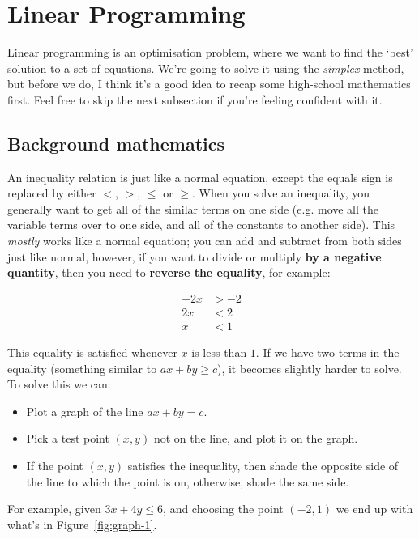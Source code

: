 
\section{Linear Programming}

Linear programming is an optimisation problem, where we want to find the `best'
solution to a set of equations. We're going to solve it using the
\textit{simplex} method, but before we do, I think it's a good idea to recap
some high-school mathematics first. Feel free to skip the next subsection if
you're feeling confident with it.

\subsection{Background mathematics}

An inequality relation is just like a normal equation, except the equals sign is
replaced by either $<$, $>$, $\leq$ or $\geq$. When you solve an inequality, you
generally want to get all of the similar terms on one side (e.g. move all the
variable terms over to one side, and all of the constants to another side). This
\textit{mostly} works like a normal equation; you can add and subtract from both
sides just like normal, however, if you want to divide or multiply \textbf{by a
negative quantity}, then you need to \textbf{reverse the equality}, for example:

\[
  \begin{split}
    -2x &> -2\\
    2x &< 2\\
    x &< 1
  \end{split}
\]

This equality is satisfied whenever $x$ is less than $1$. If we have two terms
in the equality (something similar to $ax + by \geq c$), it becomes slightly
harder to solve. To solve this we can:

\begin{itemize}
  \item Plot a graph of the line $ax + by = c$.
  \item Pick a test point $(x, y)$ not on the line, and plot it on the graph.
  \item If the point $(x, y)$ satisfies the inequality, then shade the opposite 
    side of the line to which the point is on, otherwise, shade the same side.
\end{itemize}

For example, given $3x + 4y \leq 6$, and choosing the point $(-2,1)$ we end up
with what's in Figure~\ref{fig:graph-1}.

